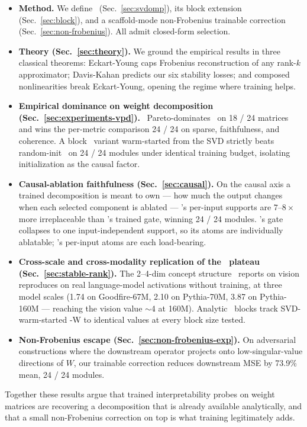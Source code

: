\begin{itemize}[leftmargin=1.5em, topsep=0.2em, itemsep=0.2em]
\item \textbf{Method.} We define \svdomp\ (Sec.\ \ref{sec:svdomp}), its block extension (Sec.\ \ref{sec:block}), and a scaffold-mode non-Frobenius trainable correction (Sec.\ \ref{sec:non-frobenius}). All admit closed-form selection.

\item \textbf{Theory (Sec.\ \ref{sec:theory}).} We ground the empirical results in three classical theorems: Eckart-Young caps Frobenius reconstruction of any rank-$k$ approximator; Davis-Kahan predicts our six stability losses; and composed nonlinearities break Eckart-Young, opening the regime where training helps.

\item \textbf{Empirical dominance on weight decomposition (Sec.\ \ref{sec:experiments-vpd}).} \svdomp\ Pareto-dominates \vpd\ on 18 / 24 matrices and wins the per-metric comparison 24 / 24 on sparse, faithfulness, and coherence. A block \bsf\ variant warm-started from the SVD strictly beats random-init \bsf\ on 24 / 24 modules under identical training budget, isolating initialization as the causal factor.

\item \textbf{Causal-ablation faithfulness (Sec.\ \ref{sec:causal}).} On the causal axis a trained decomposition is meant to own --- how much the output changes when each selected component is ablated --- \svdomp's per-input supports are $7$--$8\times$ more irreplaceable than \vpd's trained gate, winning 24 / 24 modules. \vpd's gate collapses to one input-independent support, so its atoms are individually ablatable; \svdomp's per-input atoms are each load-bearing.

\item \textbf{Cross-scale and cross-modality replication of the \bsf\ plateau (Sec.\ \ref{sec:stable-rank}).} The 2--4-dim concept structure \bsf\ reports on vision reproduces on real language-model activations without training, at three model scales (1.74 on Goodfire-67M, 2.10 on Pythia-70M, 3.87 on Pythia-160M --- reaching the vision value $\sim$4 at 160M). Analytic \svdomp\ blocks track SVD-warm-started \bsf-W to identical values at every block size tested.

\item \textbf{Non-Frobenius escape (Sec.\ \ref{sec:non-frobenius-exp}).} On adversarial constructions where the downstream operator projects onto low-singular-value directions of $W$, our trainable correction reduces downstream MSE by 73.9\% mean, 24 / 24 modules.
\end{itemize}

Together these results argue that trained interpretability probes on weight matrices are recovering a decomposition that is already available analytically, and that a small non-Frobenius correction on top is what training legitimately adds.
